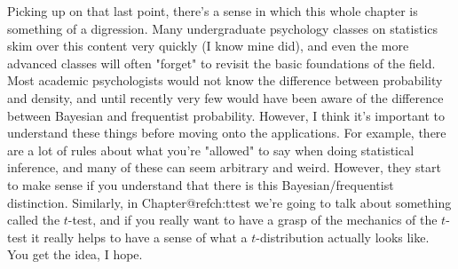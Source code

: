 Picking up on that last point, there's a sense in which this whole chapter is something of a digression. Many undergraduate psychology classes on statistics skim over this content very quickly (I know mine did), and even the more advanced classes will often "forget" to revisit the basic foundations of the field. Most academic psychologists would not know the difference between probability and density, and until recently very few would have been aware of the difference between Bayesian and frequentist probability. However, I think it's important to understand these things before moving onto the applications. For example, there are a lot of rules about what you're "allowed" to say when doing statistical inference, and many of these can seem arbitrary and weird. However, they start to make sense if you understand that there is this Bayesian/frequentist distinction. Similarly, in Chapter@refch:ttest we're going to talk about something called the $t$-test, and if you really want to have a grasp of the mechanics of the $t$-test it really helps to have a sense of what a $t$-distribution actually looks like. You get the idea, I hope.






